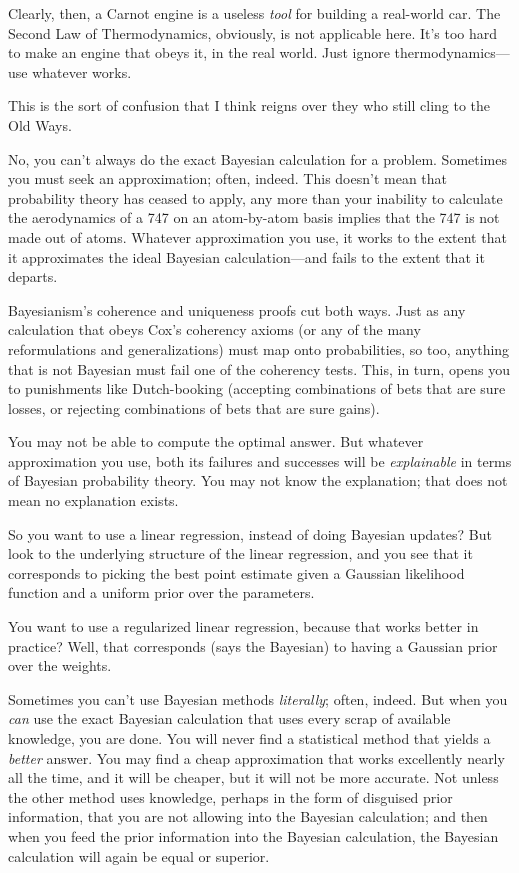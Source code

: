 {
 Clearly, then, a Carnot engine is a useless \textit{tool} for
building a real-world car. The Second Law of Thermodynamics, obviously,
is not applicable here. It's too hard to make an engine
that obeys it, in the real world. Just ignore thermodynamics---use
whatever works.}

{
 This is the sort of confusion that I think reigns over they who
still cling to the Old Ways.}

{
 No, you can't always do the exact Bayesian
calculation for a problem. Sometimes you must seek an approximation;
often, indeed. This doesn't mean that probability
theory has ceased to apply, any more than your inability to calculate
the aerodynamics of a 747 on an atom-by-atom basis implies that the 747
is not made out of atoms. Whatever approximation you use, it works to
the extent that it approximates the ideal Bayesian calculation---and
fails to the extent that it departs.}

{
 Bayesianism's coherence and uniqueness proofs cut
both ways. Just as any calculation that obeys Cox's
coherency axioms (or any of the many reformulations and
generalizations) must map onto probabilities, so too, anything that is
not Bayesian must fail one of the coherency tests. This, in turn, opens
you to punishments like Dutch-booking (accepting combinations of bets
that are sure losses, or rejecting combinations of bets that are sure
gains).}

{
 You may not be able to compute the optimal answer. But whatever
approximation you use, both its failures and successes will be
\textit{explainable} in terms of Bayesian probability theory. You may
not know the explanation; that does not mean no explanation exists.}

{
 So you want to use a linear regression, instead of doing Bayesian
updates? But look to the underlying structure of the linear regression,
and you see that it corresponds to picking the best point estimate
given a Gaussian likelihood function and a uniform prior over the
parameters.}

{
 You want to use a regularized linear regression, because that
works better in practice? Well, that corresponds (says the Bayesian) to
having a Gaussian prior over the weights.}

{
 Sometimes you can't use Bayesian methods
\textit{literally}; often, indeed. But when you \textit{can} use the
exact Bayesian calculation that uses every scrap of available
knowledge, you are done. You will never find a statistical method that
yields a \textit{better} answer. You may find a cheap approximation
that works excellently nearly all the time, and it will be cheaper, but
it will not be more accurate. Not unless the other method uses
knowledge, perhaps in the form of disguised prior information, that you
are not allowing into the Bayesian calculation; and then when you feed
the prior information into the Bayesian calculation, the Bayesian
calculation will again be equal or superior.}

